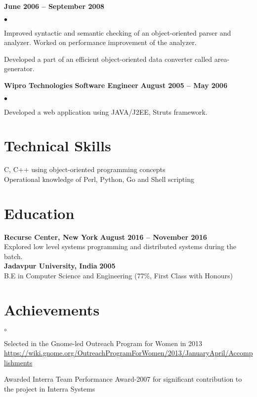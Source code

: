 \documentclass[margin,line]{res}
\newenvironment{list1}{
  \begin{list}{$\bullet$}{%
      \setlength{\itemsep}{0in}
      \setlength{\parsep}{0in} \setlength{\parskip}{0in}
      \setlength{\topsep}{0in} \setlength{\partopsep}{0in}
      \setlength{\leftmargin}{0.17in}}}{\end{list}}
\newenvironment{list2}{
  \begin{list}{$\circ$}{%
      \setlength{\itemsep}{0in}
      \setlength{\parsep}{0in} \setlength{\parskip}{0in}
      \setlength{\topsep}{0in} \setlength{\partopsep}{0in}
      \setlength{\leftmargin}{0.2in}}}{\end{list}}
\begin{document}
\begin{resume}
\hfill{\bf June 2006 -- September 2008}
\vspace{.05in}
\begin{list1} %
\item Improved syntactic and semantic checking of an object-oriented parser and analyzer. Worked on performance improvement of the analyzer.
\item Developed a part of an efficient object-oriented data converter called area-generator.
\end{list1}
{\bf   Wipro Technologies}
\hfill {\bf Software Engineer}
\hfill{\bf August 2005 -- May 2006}
\vspace{.05in}
\begin{list1} %
\item Developed a web application using JAVA/J2EE, Struts framework.\\
\end{list1}

\section{\sc Technical Skills}
C, C++ using object-oriented programming concepts\\
Operational knowledge of Perl, Python, Go and Shell scripting\\

\section{\sc Education}
{\bf Recurse Center, New York} \hfill {\bf August 2016 -- November 2016}\\
Explored low level systems programming and distributed systems during the batch.\\
{\bf Jadavpur University, India} \hfill {\bf 2005}\\
B.E in Computer Science and Engineering \hfill(77\%, First Class with Honours)\\

\section{\sc Achievements}
\begin{list2} %
\item Selected in the Gnome-led Outreach Program for Women in 2013 \url {https://wiki.gnome.org/OutreachProgramForWomen/2013/JanuaryApril/Accomplishments}
\item Awarded Interra Team Performance Award-2007 for significant contribution to the project in Interra Systems\\
\end{list2}

\end{resume}
\end{document}
